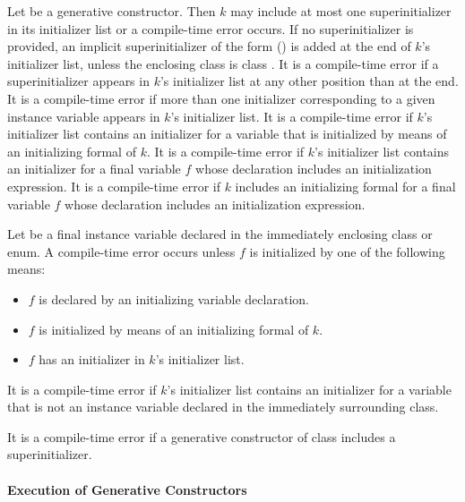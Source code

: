\documentclass[makeidx]{article}
\begin{document}
\LMHash{}%
Let  be a generative constructor.
Then $k$ may include at most one superinitializer in its initializer list
or a compile-time error occurs.
If no superinitializer is provided,
an implicit superinitializer of the form \SUPER{}() is added
at the end of $k$'s initializer list,
unless the enclosing class is class .
It is a compile-time error if a superinitializer appears
in $k$'s initializer list at any other position than at the end.
It is a compile-time error if more than one initializer corresponding
to a given instance variable appears in $k$'s initializer list.
It is a compile-time error if $k$'s initializer list contains
an initializer for a variable that is initialized by means of
an initializing formal of $k$.
It is a compile-time error if $k$'s initializer list contains
an initializer for a final variable $f$ whose declaration includes
an initialization expression.
It is a compile-time error if $k$ includes an initializing formal
for a final variable $f$ whose declaration includes
an initialization expression.

\LMHash{}%
Let  be a final instance variable declared in
the immediately enclosing class or enum.
A compile-time error occurs unless $f$ is initialized
by one of the following means:

\begin{itemize}
\item $f$ is declared by an initializing variable declaration.
\item $f$ is initialized by means of an initializing formal of $k$.
\item $f$ has an initializer in $k$'s initializer list.
\end{itemize}

\LMHash{}%
It is a compile-time error if $k$'s initializer list contains
an initializer for a variable that is not
an instance variable declared in the immediately surrounding class.


\LMHash{}%
It is a compile-time error if a generative constructor of class 
includes a superinitializer.


\paragraph{Execution of Generative Constructors}
\end{document}
